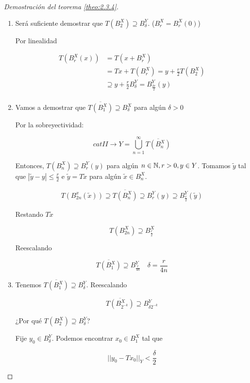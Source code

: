 \begin{proof}[Demostración del teorema \ref{theo:2.3.4}]
    \begin{enumerate}
        \item Será suficiente demostrar que $T(B_2^X)\supseteq B_\delta^Y$. ($B_r^X=B_r^X(0)$)
        
        Por linealidad

        \begin{align*}
            T(B_r^X(x))&=T(x+B_r^X)\\
            &=Tx+T(B_r^X)={y+\frac{r}{2}T(B_2^X)}\\
            &\supseteq y+\frac{r}{2}B_\delta^Y=B_{\frac{\delta r}{2}}^Y(y)\\
        \end{align*}

        \item Vamos a demostrar que $\overline{T(B_1^X)}\supseteq B_\delta^X$ para algún $\delta>0$
        
        Por la sobreyectividad:

        \[cat II\rightarrow Y=\bigcup_{n=1}^\infty \overline{T(B_n^X)}\]

        Entonces, $T(B_n^X)\supseteq B_r^Y(y)$ para algún $n\in\mathbb{N},r>0,y\in Y$. Tomamos $\tilde y$ tal que $|\tilde y-y|\leq \frac{r}{2}$ e $\tilde y=T\tilde x$ para algún $\tilde x\in B_n^X$.

        \begin{align*}
            T(B_{2n}^x(\tilde x))\supseteq \overline{T(B_n^X)}\supseteq B_r^Y(y)\supseteq B_{\frac{r}{2}}^Y(\tilde y)
        \end{align*}

        Restando $T\tilde x$

        \[T(B_{2n}^X)\supseteq B_{\frac{r}{2}}^X\]

        Reescalando

        \[\overline{T(B_1^X)}\supseteq B_{\frac{r}{4n}}^Y\quad \delta=\frac{r}{4n}\]

        \item Tenemos $\overline{T(B_1^X)}\supseteq B_\delta^Y$. Reescalando
        
        \[\overline{T(B_{2^{-k}}^X)}\supseteq B_{\delta 2^{-k}}^Y\]

        ¿Por qué $T(B_2^X)\supseteq B_\delta^Y$?

        Fije $y_0\in B_\delta^Y$. Podemos encontrar $x_0\in B_1^X$ tal que 

        \[||y_0-Tx_0||_Y<\frac{\delta}{2}\]


\end{enumerate}
\end{proof}
